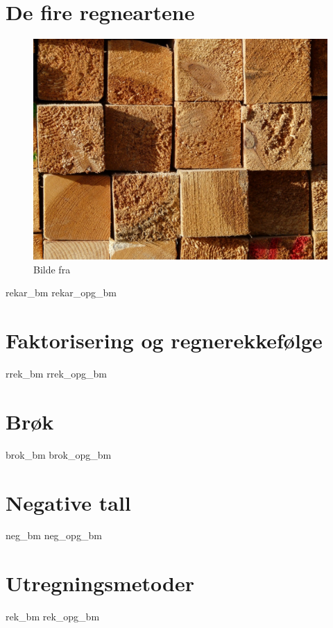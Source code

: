 \chapter{De fire regneartene \label{Rekneartane}}
\begin{figure}
	\centering
	\includegraphics[scale=0.38]{wood} \\
	{\footnotesize Bilde fra } 
\end{figure}
\newpage
{rekar_bm}
{rekar_opg_bm}


\chapter{Faktorisering og regnerekkefølge \label{Faktogrek}}
\newpage
{rrek_bm}
{rrek_opg_bm}

\chapter{Brøk \label{Brok}} 
\newpage
{brok_bm}
\newpage
{brok_opg_bm}

\chapter{Negative tall \label{Negtal}}
\newpage
{neg_bm}
{neg_opg_bm}

\chapter{Utregningsmetoder \label{Utrekning}}
\newpage
{rek_bm}
\newpage
{rek_opg_bm}


